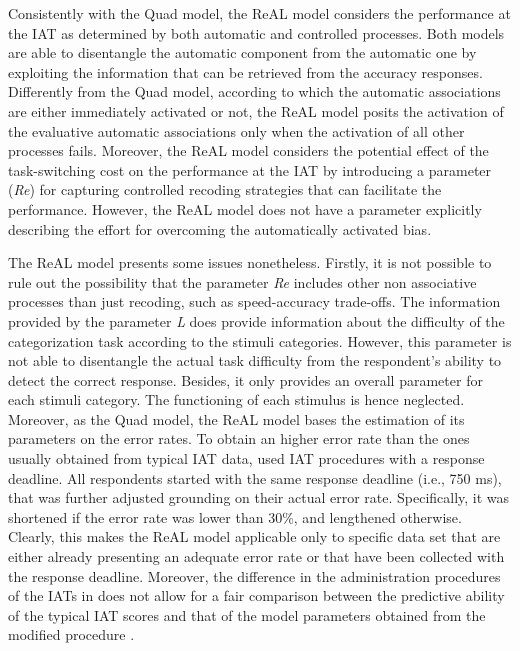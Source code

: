 \documentclass[12pt]{book}
\begin{document}
Consistently with the Quad model, the ReAL model considers the performance at the IAT as determined by both automatic and controlled processes. 
Both models are able to disentangle the automatic component from the automatic one by exploiting the information that can be retrieved from the accuracy responses. 
Differently from the Quad model, according to which the automatic associations are either immediately activated or not, the ReAL model posits the activation of the evaluative automatic associations only when the activation of all other processes fails. 
Moreover, the ReAL model considers the potential effect of the task-switching cost on the performance at the IAT by introducing a parameter (\emph{Re}) for capturing controlled recoding strategies that can facilitate the performance. 
However, the ReAL model does not have a parameter explicitly describing the effort for overcoming the automatically activated bias.

The ReAL model presents some issues nonetheless. 
Firstly, it is not possible to rule out the possibility that the parameter \emph{Re} includes other non associative processes than just recoding, such as speed-accuracy trade-offs. 
The information provided by the parameter \emph{L} does provide information about the difficulty of the categorization task according to the stimuli categories. 
However, this parameter is not able to disentangle the actual task difficulty from the respondent's ability to detect the correct response. Besides, it only provides an overall parameter for each stimuli category. The functioning of each stimulus is hence neglected.
Moreover, as the Quad model, the ReAL model bases the estimation of its parameters on the error rates. To obtain an higher error rate than the ones usually obtained from typical IAT data,  used IAT procedures with a response deadline. All respondents started with the same response deadline (i.e., 750 ms), that was further adjusted grounding on their actual error rate. 
Specifically, it was shortened if the error rate was lower than 30\%, and lengthened otherwise. 
Clearly, this makes the ReAL model applicable only to specific data set that are either already presenting an adequate error rate or that have been collected with the response deadline. Moreover, the difference in the administration procedures of the IATs in  does not allow for a fair comparison between the predictive ability of the typical IAT scores and that of the model parameters obtained from the modified procedure \cite<see Discussion of Study 7 in >[for further details]{Meissner2013}. 
\end{document}

